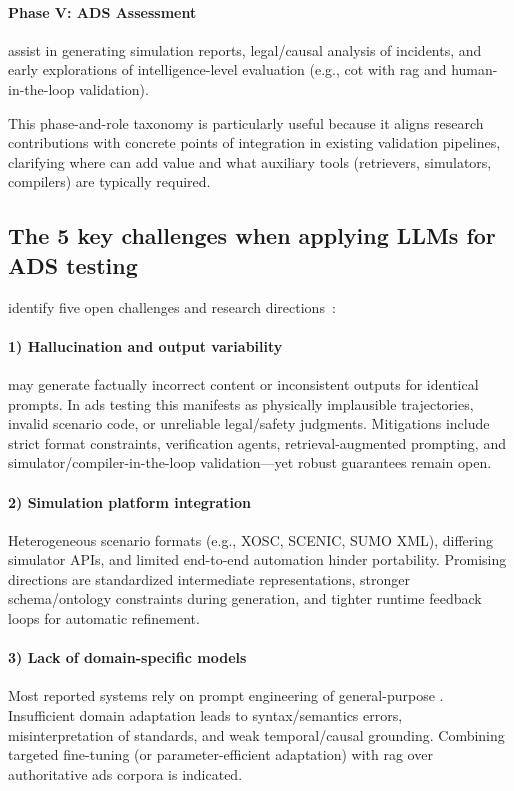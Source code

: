 \paragraph{Phase V: ADS Assessment}
 assist in generating simulation reports, legal/causal analysis
of incidents, and early explorations of intelligence-level evaluation (e.g.,
\acrshort{cot} with \acrshort{rag} and human-in-the-loop validation).

This phase-and-role taxonomy is particularly useful because it aligns research
contributions with concrete points of integration in existing validation
pipelines, clarifying where  can add value and what auxiliary
tools (retrievers, simulators, compilers) are typically required.

\subsection{The \num{5} key challenges when applying LLMs for ADS testing}

\citeauthor{surveyLLMScenarioBasedTesting} identify five open challenges and
research directions~\cite{surveyLLMScenarioBasedTesting}:

\paragraph{1) Hallucination and output variability}
 may generate factually incorrect content or inconsistent
outputs for identical prompts. In \acrshort{ads} testing this manifests as
physically implausible trajectories, invalid scenario code, or unreliable
legal/safety judgments. Mitigations include strict format constraints,
verification agents, retrieval-augmented prompting, and
simulator/compiler-in-the-loop validation—yet robust guarantees remain open.

\paragraph{2) Simulation platform integration}
Heterogeneous scenario formats (e.g., XOSC, SCENIC, SUMO XML), differing
simulator APIs, and limited end-to-end automation hinder portability. Promising
directions are standardized intermediate representations, stronger
schema/ontology constraints during generation, and tighter runtime feedback
loops for automatic refinement.

\paragraph{3) Lack of domain-specific models}
Most reported systems rely on prompt engineering of general-purpose
. Insufficient domain adaptation leads to syntax/semantics
errors, misinterpretation of standards, and weak temporal/causal grounding.
Combining targeted fine-tuning (or parameter-efficient adaptation) with
\acrshort{rag} over authoritative \acrshort{ads} corpora is indicated.

